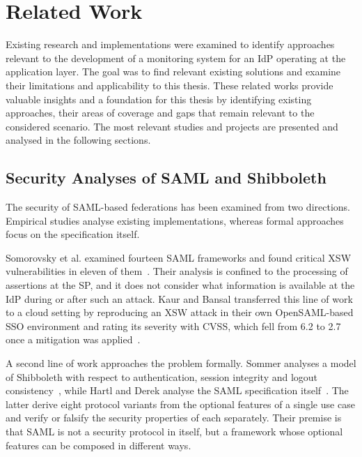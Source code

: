 \documentclass[../main.tex]{subfiles}
\begin{document}
\chapter{Related Work}\label{ch:related-work}

Existing research and implementations were examined to identify approaches relevant to the 
development of a monitoring system for an IdP operating at the application layer. 
The goal was to find relevant existing solutions and examine their limitations and 
applicability to this thesis. 
These related works provide valuable insights and a foundation for this thesis by identifying 
existing approaches, their areas of coverage and gaps that remain relevant to the 
considered scenario. 
The most relevant studies and projects are presented and analysed in the following sections.

\section{Security Analyses of SAML and Shibboleth}\label{sec:saml-analyses}

The security of SAML-based federations has been examined from two directions. 
Empirical studies analyse existing implementations, whereas formal approaches 
focus on the specification itself. 

Somorovsky et al. examined fourteen SAML frameworks and found critical XSW vulnerabilities in 
eleven of them~\cite{BreakingSAML}. 
Their analysis is confined to the processing of assertions at the SP, and it does not consider 
what information is available at the IdP during or after such an attack. 
Kaur and Bansal transferred this line of work to a cloud setting by reproducing an XSW attack in their 
own OpenSAML-based SSO environment and rating its severity with CVSS, which fell from 6.2 to 2.7 once 
a mitigation was applied~\cite{VulnerSAMLCloud}. 

A second line of work approaches the problem formally. 
Sommer analyses a model of Shibboleth with respect to authentication, session integrity 
and logout consistency~\cite{SecAnalysisSSO}, while Hartl and Derek analyse the SAML 
specification itself~\cite{FormalSecAnalysisSAML}. 
The latter derive eight protocol variants from the optional features of a single use case and 
verify or falsify the security properties of each separately. 
Their premise is that SAML is not a security protocol in itself, but a framework whose optional 
features can be composed in different ways.
\end{document}
